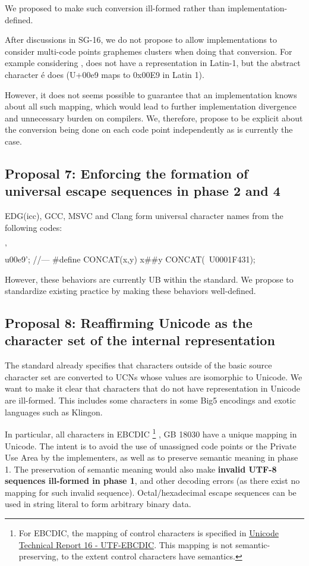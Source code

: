\documentclass{wg21}
\begin{document}
We proposed to make such conversion ill-formed rather than implementation-defined.

After discussions in SG-16, we do not propose to allow implementations to consider multi-code points graphemes clusters
when doing that conversion. For example considering ,  does not have a representation in Latin-1,
but the abstract character é does (U+00e9 maps to 0x00E9 in Latin 1).

However, it does not seems possible to guarantee that an implementation knows about all such mapping, which would lead to further implementation
divergence and unnecessary burden on compilers.
We, therefore, propose to be explicit about the conversion being done on each code point independently as is currently the case.

\subsection{Proposal 7: Enforcing the formation of universal escape sequences in phase 2 and 4}

EDG(icc), GCC, MSVC and Clang form universal character names from the following codes:
\begin{colorblock}
'\\
u00e9';
//---
#define CONCAT(x,y) x\#\#y
CONCAT(\, U0001F431);
\end{colorblock}

However, these behaviors are currently UB within the standard.
We propose to standardize existing practice by making these behaviors well-defined.


\subsection{Proposal 8: Reaffirming Unicode as the character set of the internal representation}

The standard already specifies that characters outside of the basic source character set are converted to UCNs whose values are isomorphic to
Unicode.
We want to make it clear that characters that do not have representation in Unicode are ill-formed.
This includes some characters in some Big5 encodings and exotic languages such as Klingon.

In particular, all characters in EBCDIC
\footnote{For EBCDIC, the mapping of control characters is specified in \href{http://www.unicode.org/reports/tr16/tr16-8.html}{Unicode Technical Report 16 - UTF-EBCDIC}.
This mapping is not semantic-preserving, to the extent control characters have semantics.
}
, GB 18030 have a unique mapping in Unicode.
The intent is to avoid the use of unassigned code points or the Private Use Area by the implementers, as well as to preserve semantic meaning in phase 1.
The preservation of semantic meaning would also make \textbf{invalid UTF-8 sequences ill-formed in phase 1}, and other decoding errors (as there exist no mapping for such invalid sequence).
Octal/hexadecimal escape sequences can be used in string literal to form arbitrary binary data.
\end{document}
